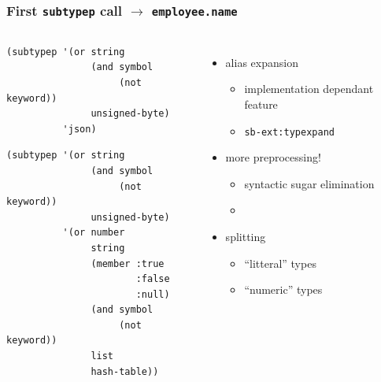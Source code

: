 \documentclass[aspectratio=169]{beamer}
\renewcommand\code[1]{\texttt{#1}}
\newcommand\rarr{\ensuremath{\rightarrow}}
\begin{document}
\begin{frame}[fragile]
  \frametitle{First \code{subtypep} call \rarr{} \code{employee.name}}
  \begin{columns}
  \begin{mintedcodebox}[title=\code{name}'s type verification,icon=\(\lambda\),compact]
    \begin{overprint}
\begin{verbatim}
(subtypep '(or string
               (and symbol
                    (not keyword))
               unsigned-byte)
          'json)
\end{verbatim}

\begin{verbatim}
(subtypep '(or string
               (and symbol
                    (not keyword))
               unsigned-byte)
          '(or number
               string
               (member :true
                       :false
                       :null)
               (and symbol
                    (not keyword))
               list
               hash-table))
\end{verbatim}
    \end{overprint}
  \end{mintedcodebox}

    \begin{itemize}
    \item<2-> alias expansion
      \begin{itemize}
      \item implementation dependant feature
      \item \code{sb-ext:typexpand}
      \end{itemize}
    \item<3-> more preprocessing!
      \begin{itemize}
      \item syntactic sugar elimination
      \item {}
      \end{itemize}
    \item<5-> splitting
      \begin{itemize}
      \item ``litteral'' types
      \item ``numeric'' types
      \end{itemize}
    \end{itemize}
  \end{columns}
\end{frame}
\end{document}
